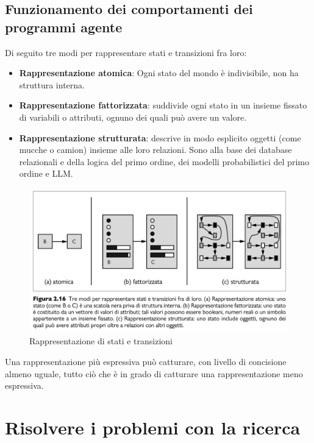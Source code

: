 \documentclass{article}
\begin{document}
\subsection{Funzionamento dei comportamenti dei programmi agente}
Di seguito tre modi per rappresentare stati e transizioni fra loro:
\begin{itemize}
    \item \textbf{Rappresentazione atomica}: Ogni stato del mondo è indivisibile, non ha struttura interna. 
    \item \textbf{Rappresentazione fattorizzata}: suddivide ogni stato in un insieme fissato di variabili o attributi, ognuno dei quali può avere un valore. 
    \item \textbf{Rappresentazione strutturata}: descrive in modo esplicito oggetti (come mucche o camion) insieme alle loro relazioni. Sono alla base dei database relazionali e della logica del primo ordine, dei modelli probabilistici del primo ordine e LLM.
\end{itemize}
\begin{figure}[H]
    \centering
    \includegraphics[width=0.5\linewidth]{Images/RappresentazioniStatiTransazioni.png}
    \caption{Rappresentazione di stati e transizioni}
    \label{fig:enter-label}
\end{figure}
Una rappresentazione più espressiva può catturare, con livello di concisione almeno uguale, tutto ciò che è in grado di catturare una rappresentazione meno espressiva.
\newpage
\section{Risolvere i problemi con la ricerca}
\end{document}
